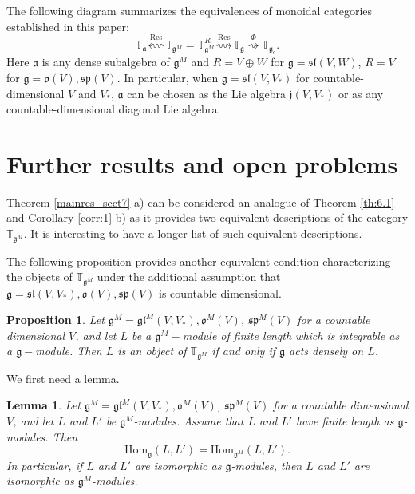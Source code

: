 \documentclass{svmult}
\newtheorem{lem}[theo]{Lemma}
\newtheorem{prop}[theo]{Proposition}
\newcommand{\TT}{\mathbb{T}}
\newcommand{\jj}{\mathfrak{j}}
\renewcommand{\sp}{\mathfrak{sp}}
\renewcommand{\sl}{\mathfrak{sl}}
\newcommand{\oo}{\mathfrak{o}}
\renewcommand{\aa}{\mathfrak{a}}
\renewcommand{\gg}{\mathfrak{g}}
\newcommand{\gl}{\mathfrak{gl}}
\newcommand{\Hom}{\mathrm{Hom}}
\begin{document}
\vspace{0.33cm}

The following diagram summarizes the equivalences of monoidal categories established in this paper:
$$ \TT_{\aa} \stackrel{\operatorname{Res}}{\leftsquigarrow} \TT_{\gg^M} = \TT_{\gg^M}^R \stackrel {\operatorname{Res}}{\rightsquigarrow} \TT_{\gg} \stackrel{\Phi}{\rightsquigarrow} \TT_{\gg_c}.$$
Here $\aa$ is any dense subalgebra of $\gg^M$ and $R = V\oplus W$ for $\gg = \sl(V,W)$, $R=V$ for $\gg = \oo(V), \sp(V)$. In particular, when $\gg = \sl(V,V_*)$ for countable-dimensional $V$ and $V_*$, $\aa$ can be chosen as the Lie algebra $\jj(V,V_*)$ or as any countable-dimensional diagonal Lie algebra.

\section{Further results and open problems}\label{sect:8}

Theorem \ref{mainres_sect7} a) can be considered an analogue of Theorem \ref{th:6.1} and Corollary \ref{corr:1} b) as it provides two equivalent descriptions of the category $\TT_{\gg^M}$. It is interesting to have a longer list of such equivalent descriptions.

The following proposition provides another equivalent condition characterizing the objects of $\TT_{\gg^M}$ under the additional assumption that 
$\gg= \sl(V,V_*), \oo(V), \sp(V)$ is countable dimensional.


\begin{prop}\label{prop_sect8}
Let $\gg^M=\gl^M(V,V_*), \oo^M(V)$, $\sp^M(V)$ for a countable dimensional $V$, and let $L$ be a $\gg^M-$module of finite length which is integrable as a $\gg-$module. Then $L$ is an object of $\TT_{\gg^M}$ if and only if $\gg$ acts densely on $L$.
\end{prop}

We first need a lemma.

\begin{lem}\label{extension} Let $\gg^M=\gl^M(V,V_*), \oo^M(V)$, $\sp^M(V)$ for a countable dimensional $V$, and let $L$ and $L'$ be  
$\gg^M$-modules. 
Assume that $L$ and $L'$ have finite length as $\gg$-modules. Then 
$$\Hom_{\gg}(L,L')=\Hom_{\gg^M}(L,L').$$
In particular, if $L$ and $L'$ are isomorphic as $\gg$-modules, then $L$ and $L'$ are isomorphic as $\gg^M$-modules. 
\end{lem}
\end{document}
